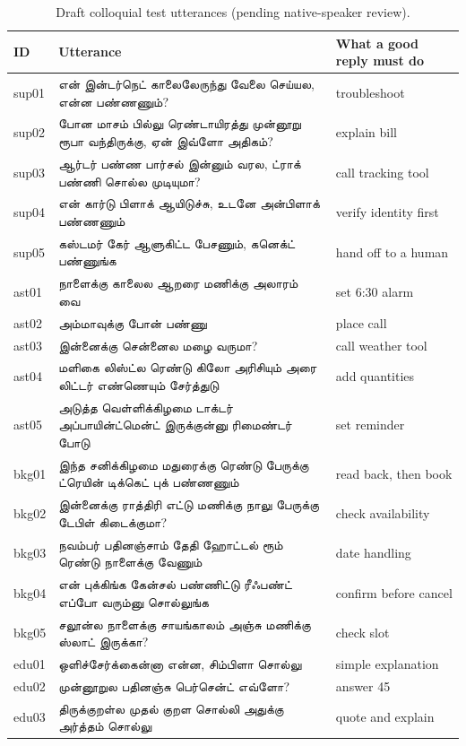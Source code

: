 \documentclass[11pt]{article}
\newcommand{\ta}[1]{{\tamilfont #1}}
\begin{document}
\begin{table}[h]
\centering\footnotesize
\caption{Draft colloquial test utterances (pending native-speaker review).}
\begin{tabular}{l >{\raggedright\arraybackslash}p{10.6cm} >{\raggedright\arraybackslash}p{3cm}}
\toprule
ID & Utterance & What a good reply must do \\
\midrule
sup01 & \ta{என் இன்டர்நெட் காலைலேருந்து வேலை செய்யல, என்ன பண்ணணும்?} & troubleshoot \\
sup02 & \ta{போன மாசம் பில்லு ரெண்டாயிரத்து முன்னூறு ரூபா வந்திருக்கு, ஏன் இவ்ளோ அதிகம்?} & explain bill \\
sup03 & \ta{ஆர்டர் பண்ண பார்சல் இன்னும் வரல, ட்ராக் பண்ணி சொல்ல முடியுமா?} & call tracking tool \\
sup04 & \ta{என் கார்டு பிளாக் ஆயிடுச்சு, உடனே அன்பிளாக் பண்ணணும்} & verify identity first \\
sup05 & \ta{கஸ்டமர் கேர் ஆளுகிட்ட பேசணும், கனெக்ட் பண்ணுங்க} & hand off to a human \\
ast01 & \ta{நாளைக்கு காலைல ஆறரை மணிக்கு அலாரம் வை} & set 6:30 alarm \\
ast02 & \ta{அம்மாவுக்கு போன் பண்ணு} & place call \\
ast03 & \ta{இன்னைக்கு சென்னைல மழை வருமா?} & call weather tool \\
ast04 & \ta{மளிகை லிஸ்ட்ல ரெண்டு கிலோ அரிசியும் அரை லிட்டர் எண்ணெயும் சேர்த்துடு} & add quantities \\
ast05 & \ta{அடுத்த வெள்ளிக்கிழமை டாக்டர் அப்பாயின்ட்மென்ட் இருக்குன்னு ரிமைண்டர் போடு} & set reminder \\
bkg01 & \ta{இந்த சனிக்கிழமை மதுரைக்கு ரெண்டு பேருக்கு ட்ரெயின் டிக்கெட் புக் பண்ணணும்} & read back, then book \\
bkg02 & \ta{இன்னைக்கு ராத்திரி எட்டு மணிக்கு நாலு பேருக்கு டேபிள் கிடைக்குமா?} & check availability \\
bkg03 & \ta{நவம்பர் பதினஞ்சாம் தேதி ஹோட்டல் ரூம் ரெண்டு நாளைக்கு வேணும்} & date handling \\
bkg04 & \ta{என் புக்கிங்க கேன்சல் பண்ணிட்டு ரீஃபண்ட் எப்போ வரும்னு சொல்லுங்க} & confirm before cancel \\
bkg05 & \ta{சலூன்ல நாளைக்கு சாயங்காலம் அஞ்சு மணிக்கு ஸ்லாட் இருக்கா?} & check slot \\
edu01 & \ta{ஒளிச்சேர்க்கைன்னா என்ன, சிம்பிளா சொல்லு} & simple explanation \\
edu02 & \ta{முன்னூறுல பதினஞ்சு பெர்சென்ட் எவ்ளோ?} & answer 45 \\
edu03 & \ta{திருக்குறள்ல முதல் குறள சொல்லி அதுக்கு அர்த்தம் சொல்லு} & quote and explain \\

\end{tabular}
\end{table}
\end{document}
